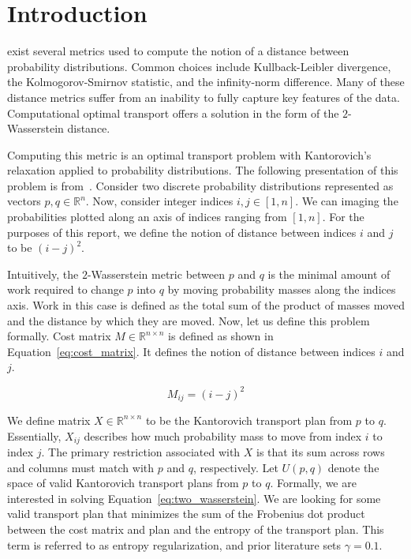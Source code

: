 \documentclass[journal]{IEEEtran}
\begin{document}
\section{Introduction}
 exist several metrics used to compute the notion of a distance between probability distributions. Common choices include Kullback-Leibler divergence, the Kolmogorov-Smirnov statistic, and the infinity-norm difference. Many of these distance metrics suffer from an inability to fully capture key features of the data. Computational optimal transport offers a solution in the form of the $2$-Wasserstein distance.


Computing this metric is an optimal transport problem with Kantorovich's relaxation applied to probability distributions. The following presentation of this problem is from~\cite{dvurechensky2023nearoptimal}. Consider two discrete probability distributions represented as vectors $p, q \in \mathbb{R}^n$. Now, consider integer indices $i, j \in [1, n]$. We can imaging the probabilities plotted along an axis of indices ranging from $[1, n]$. For the purposes of this report, we define the notion of distance between indices $i$ and $j$ to be $(i-j)^2$.

Intuitively, the $2$-Wasserstein metric between $p$ and $q$ is the minimal amount of work required to change $p$ into $q$ by moving probability masses along the indices axis. Work in this case is defined as the total sum of the product of masses moved and the distance by which they are moved. Now, let us define this problem formally. Cost matrix $M \in \mathbb{R}^{n \times n}$ is defined as shown in Equation~\ref{eq:cost_matrix}. It defines the notion of distance between indices $i$ and $j$.

\begin{equation}
    M_{ij} = (i-j)^2
    \label{eq:cost_matrix}
\end{equation}

We define matrix $X \in \mathbb{R}^{n \times n}$ to be the Kantorovich transport plan from $p$ to $q$. Essentially, $X_{ij}$ describes how much probability mass to move from index $i$ to index $j$. The primary restriction associated with $X$ is that its sum across rows and columns must match with $p$ and $q$, respectively. Let $U(p, q)$ denote the space of valid Kantorovich transport plans from $p$ to $q$. Formally, we are interested in solving Equation~\ref{eq:two_wasserstein}. We are looking for some valid transport plan that minimizes the sum of the Frobenius dot product between the cost matrix and plan and the entropy of the transport plan. This term is referred to as entropy regularization, and prior literature sets $\gamma=0.1$.
\end{document}
